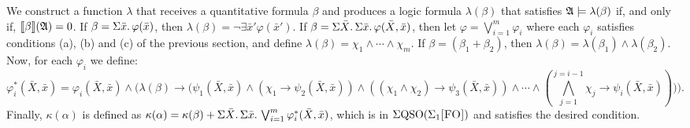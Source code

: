 We construct a function $\lambda$ that receives a quantitative formula $\beta$ and produces a logic formula $\lambda(\beta)$ that satisfies $\mathfrak{A}\models\lambda(\beta)$ if, and only if, ${\llbracket{}{\beta}\rrbracket}(\mathfrak{A}) = 0$. If $\beta = \Sigma{\bar{x}}.\, \varphi(\bar{x})$, then $\lambda(\beta) = \neg\exists\bar{x}'\varphi(\bar{x}')$. If $\beta = \Sigma{\bar{X}}.\,\Sigma{\bar{x}}.\,\varphi(\bar{X},\bar{x})$, then let $\varphi = \bigvee_{i = 1}^{m}\varphi_i$ where each $\varphi_i$ satisfies conditions (a), (b) and (c) of the previous section, and define $\lambda(\beta) = \chi_1\wedge \cdots\wedge\chi_m$. If $\beta = (\beta_1 + \beta_2)$, then $\lambda(\beta) = \lambda(\beta_1) \wedge \lambda(\beta_2)$.
Now, for each $\varphi_i$ we define:
$$
\varphi_i^*(\bar{X},\bar{x}) = \varphi_i(\bar{X},\bar{x})\wedge\Big(\lambda(\beta)\to\Big(\psi_1(\bar{X},\bar{x})\wedge(\chi_1\to\psi_2(\bar{X},\bar{x}))\wedge((\chi_1\wedge\chi_2)\to\psi_3(\bar{X},\bar{x}))\wedge\cdots\wedge(
\bigwedge_{j = 1}^{j = i-1}\chi_j\to\psi_i(\bar{X},\bar{x}))\Big)\Big).
$$
Finally, $\kappa(\alpha)$ is defined as $\kappa(\alpha) = \kappa(\beta) + \Sigma{\bar{X}}.\,\Sigma{\bar{x}}.\, \bigvee_{i = 1}^m\varphi_i^*(\bar{X},\bar{x})$, which is in $\Sigma{\rm QSO}(\Sigma_{1}\textsc{[FO]})$ and satisfies the desired condition.









